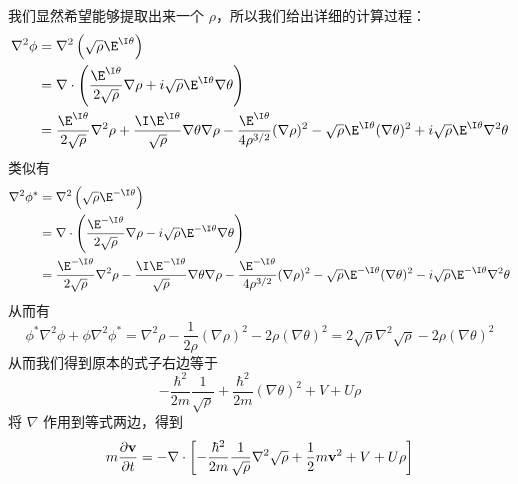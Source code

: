 我们显然希望能够提取出来一个 $\rho$，所以我们给出详细的计算过程：
\begin{equation}
\begin{split}
\nabla^2\phi &= \nabla^2\left(\sqrt\rho \E^{\I\theta}\right)\\
&=\nabla\cdot\left(\frac{\E^{\I\theta}}{2\sqrt\rho}\nabla\rho+i\sqrt{\rho} \E^{\I\theta}\nabla\theta\right)\\
&=\frac{\E^{\I\theta}}{2\sqrt\rho}\nabla^2\rho+\frac{\I \E^{\I\theta}}{\sqrt\rho}\nabla\theta\nabla\rho - \frac{\E^{\I\theta}}{4\rho^{3/2}}(\nabla\rho)^2-\sqrt\rho \E^{\I\theta}(\nabla\theta)^2+i\sqrt\rho \E^{\I\theta}\nabla^2\theta
\end{split}
\end{equation}
类似有
\begin{equation}
\begin{split}
\nabla^2\phi^* &= \nabla^2\left(\sqrt\rho \E^{-\I\theta}\right)\\
&=\nabla\cdot\left(\frac{\E^{-\I\theta}}{2\sqrt\rho}\nabla\rho-i\sqrt{\rho} \E^{-\I\theta}\nabla\theta\right)\\
&=\frac{\E^{-\I\theta}}{2\sqrt\rho}\nabla^2\rho-\frac{\I \E^{-\I\theta}}{\sqrt\rho}\nabla\theta\nabla\rho - \frac{\E^{-\I\theta}}{4\rho^{3/2}}(\nabla\rho)^2-\sqrt\rho \E^{-\I\theta}(\nabla\theta)^2-i\sqrt\rho \E^{-\I\theta}\nabla^2\theta
\end{split}
\end{equation}
从而有
\begin{equation}
\phi^*\nabla^2\phi+\phi\nabla^2\phi^* = \nabla^2\rho - \frac{1}{2\rho}(\nabla\rho)^2-2\rho(\nabla\theta)^2 = 2\sqrt\rho \nabla^2\sqrt\rho - 2\rho(\nabla\theta)^2
\end{equation}
从而我们得到原本的式子右边等于
\begin{equation}
-\frac{\hbar^2}{2m}\frac{1}{\sqrt\rho}+\frac{\hbar^2}{2m}(\nabla\theta)^2+V+U\rho
\end{equation}
将 $\nabla$ 作用到等式两边，得到
\begin{equation}
m\frac{\partial\bf v}{\partial t} = -\nabla\cdot\left[-\frac{\hbar^2}{2m}\frac{1}{\sqrt\rho}\nabla^2\sqrt\rho + \frac{1}{2}m{\bf v}^2+V+U\rho\right]
\end{equation}

